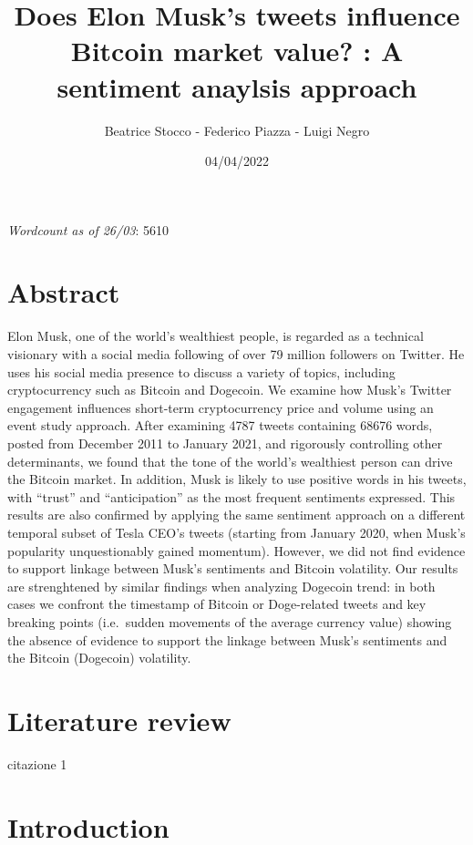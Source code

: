 \documentclass[
]{article}
\title{Does Elon Musk's tweets influence Bitcoin market value? : A
sentiment anaylsis approach}
\author{Beatrice Stocco - Federico Piazza - Luigi Negro}
\date{04/04/2022}
\begin{document}
\maketitle

\emph{Wordcount as of 26/03}: 5610

\hypertarget{abstract}{%
\section{Abstract}\label{abstract}}

Elon Musk, one of the world's wealthiest people, is regarded as a
technical visionary with a social media following of over 79 million
followers on Twitter. He uses his social media presence to discuss a
variety of topics, including cryptocurrency such as Bitcoin and
Dogecoin. We examine how Musk's Twitter engagement influences short-term
cryptocurrency price and volume using an event study approach. After
examining 4787 tweets containing 68676 words, posted from December 2011
to January 2021, and rigorously controlling other determinants, we found
that the tone of the world's wealthiest person can drive the Bitcoin
market. In addition, Musk is likely to use positive words in his tweets,
with ``trust'' and ``anticipation'' as the most frequent sentiments
expressed. This results are also confirmed by applying the same
sentiment approach on a different temporal subset of Tesla CEO's tweets
(starting from January 2020, when Musk's popularity unquestionably
gained momentum). However, we did not find evidence to support linkage
between Musk's sentiments and Bitcoin volatility. Our results are
strenghtened by similar findings when analyzing Dogecoin trend: in both
cases we confront the timestamp of Bitcoin or Doge-related tweets and
key breaking points (i.e.~sudden movements of the average currency
value) showing the absence of evidence to support the linkage between
Musk's sentiments and the Bitcoin (Dogecoin) volatility.

\hypertarget{literature-review}{%
\section{Literature review}\label{literature-review}}

citazione 1

\hypertarget{introduction}{%
\section{Introduction}\label{introduction}}
\end{document}

